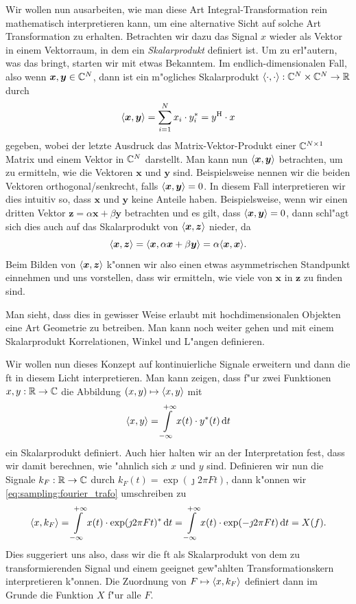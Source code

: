 Wir wollen nun ausarbeiten, wie man diese Art Integral-Transformation rein mathematisch interpretieren kann, um eine alternative Sicht auf solche Art Transformation zu erhalten.
Betrachten wir dazu das Signal $x$ wieder als Vektor in einem Vektorraum, in dem ein \emph{Skalarprodukt} definiert ist.
Um zu erl"autern, was das bringt, starten wir mit etwas Bekanntem.
Im endlich-dimensionalen Fall, also wenn $\bm x, \bm y \in \mathbb{C}^N$, dann ist ein m"ogliches Skalarprodukt ${\left\langle \cdot,\cdot \right\rangle} : \mathbb{C}^N \times \mathbb{C}^N \rightarrow \mathbb{R}$ durch
\[
 {\left\langle \bm x,\bm y \right\rangle} 
    = {\sum\limits_{i = 1}^{N}{x_i \cdot y^\ast_i}} 
    = y^{\mathrm{H}} \cdot x
\]
gegeben, wobei der letzte Ausdruck das Matrix-Vektor-Produkt einer $\mathbb{C}^{N \times 1}$ Matrix und einem Vektor in $\mathbb{C}^N$ darstellt.
Man kann nun ${\left\langle \bm x,\bm y \right\rangle}$ betrachten, um zu ermitteln, wie  die Vektoren $\bm x$ und $\bm y$ sind.
Beispielsweise nennen wir die beiden Vektoren orthogonal/senkrecht, falls ${\left\langle \bm x,\bm y \right\rangle} = 0$. 
In diesem Fall interpretieren wir dies intuitiv so, dass $\bm x$ und $\bm y$ keine  Anteile haben.
Beispielsweise, wenn wir einen dritten Vektor $\bm z = \alpha \bm x + \beta \bm y$ betrachten und es gilt, dass ${\left\langle \bm x,\bm y \right\rangle} = 0$, dann schl"agt sich dies auch auf das Skalarprodukt von ${\left\langle \bm x,\bm z \right\rangle}$ nieder, da
%
\[
    {\left\langle \bm x,\bm z \right\rangle} 
        = {\left\langle \bm x,\alpha \bm x + \beta \bm y \right\rangle}
        = \alpha {\left\langle \bm x,\bm x \right\rangle}.
\]
%
Beim Bilden von ${\left\langle \bm x,\bm z \right\rangle}$ k"onnen wir also einen etwas asymmetrischen Standpunkt einnehmen und uns vorstellen, dass wir ermitteln, wie viele  von $\bm x$ in $\bm z$ zu finden sind.

Man sieht, dass dies in gewisser Weise erlaubt mit hochdimensionalen Objekten eine Art Geometrie zu betreiben.
Man kann noch weiter gehen und mit einem Skalarprodukt Korrelationen, Winkel und L"angen definieren.

Wir wollen nun dieses Konzept auf kontinuierliche Signale erweitern und dann die \gls{ft} in diesem Licht interpretieren.
Man kann zeigen, dass f"ur zwei Funktionen $x,y : \mathbb{R} \rightarrow \mathbb{C}$ die Abbildung $(x,y) \mapsto {\left\langle x,y \right\rangle}$ mit
%
\begin{equation}\label{eq:cont_scpr}
    {\left\langle x,y \right\rangle} = {\int\limits_{-\infty}^{+\infty}{
        x(t) \cdot y^\ast(t)
    }\,\mathrm{d}{t}}
\end{equation}
%
ein Skalarprodukt definiert. 
Auch hier halten wir an der Interpretation fest, dass wir damit berechnen, wie "ahnlich sich $x$ und $y$ sind.
Definieren wir nun die Signale $k_F: \mathbb{R} \rightarrow \mathbb{C}$ durch $k_F(t) = \exp(\jmath 2 \pi F t)$, dann k"onnen wir \eqref{eq:sampling:fourier_trafo} umschreiben zu
\[
{\left\langle x,k_F \right\rangle} 
    = {\int\limits_{-\infty}^{+\infty}{
        x(t) \cdot \exp(\jmath 2 \pi F t)^\ast
    }\,\mathrm{d}{t}}
    = {\int\limits_{-\infty}^{+\infty}{
        x(t) \cdot \exp(-\jmath 2 \pi F t)
    }\,\mathrm{d}{t}}
    = X(f).
\]
Dies suggeriert uns also, dass wir die \gls{ft} als Skalarprodukt von dem zu transformierenden Signal und einem geeignet gew"ahlten Transformationskern interpretieren k"onnen.
Die Zuordnung von $F \mapsto {\left\langle x,k_F \right\rangle}$ definiert dann im Grunde die Funktion $X$ f"ur alle $F$.

